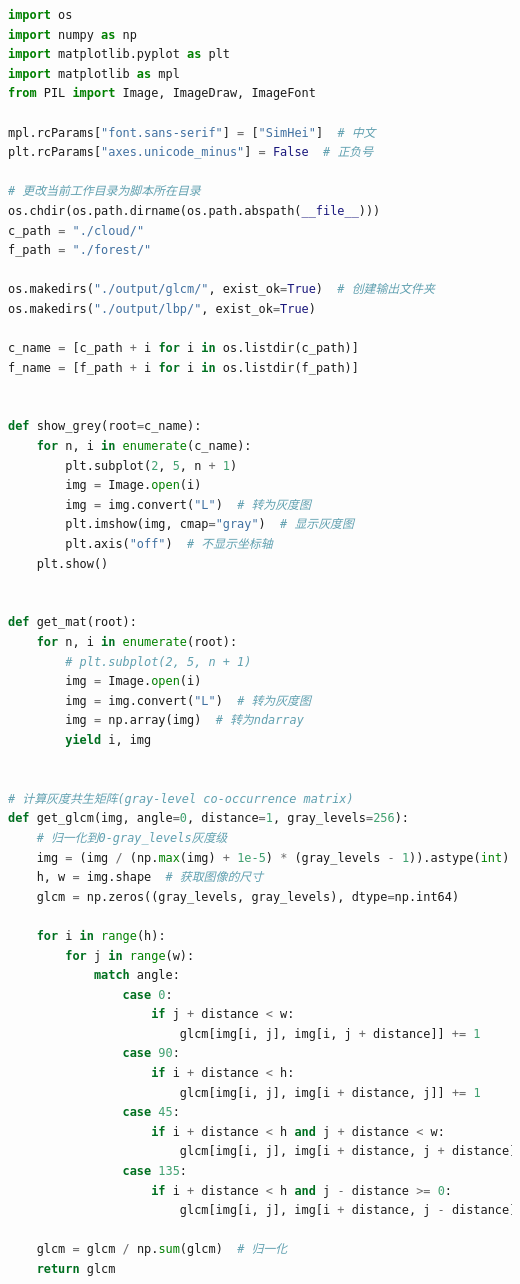 \documentclass[a4paper,12pt]{report}
\begin{document}
\begin{lstlisting}[language=Python]
import os
import numpy as np
import matplotlib.pyplot as plt
import matplotlib as mpl
from PIL import Image, ImageDraw, ImageFont

mpl.rcParams["font.sans-serif"] = ["SimHei"]  # 中文
plt.rcParams["axes.unicode_minus"] = False  # 正负号

# 更改当前工作目录为脚本所在目录
os.chdir(os.path.dirname(os.path.abspath(__file__)))
c_path = "./cloud/"
f_path = "./forest/"

os.makedirs("./output/glcm/", exist_ok=True)  # 创建输出文件夹
os.makedirs("./output/lbp/", exist_ok=True)

c_name = [c_path + i for i in os.listdir(c_path)]
f_name = [f_path + i for i in os.listdir(f_path)]


def show_grey(root=c_name):
    for n, i in enumerate(c_name):
        plt.subplot(2, 5, n + 1)
        img = Image.open(i)
        img = img.convert("L")  # 转为灰度图
        plt.imshow(img, cmap="gray")  # 显示灰度图
        plt.axis("off")  # 不显示坐标轴
    plt.show()


def get_mat(root):
    for n, i in enumerate(root):
        # plt.subplot(2, 5, n + 1)
        img = Image.open(i)
        img = img.convert("L")  # 转为灰度图
        img = np.array(img)  # 转为ndarray
        yield i, img


# 计算灰度共生矩阵(gray-level co-occurrence matrix)
def get_glcm(img, angle=0, distance=1, gray_levels=256):
    # 归一化到0-gray_levels灰度级
    img = (img / (np.max(img) + 1e-5) * (gray_levels - 1)).astype(int)
    h, w = img.shape  # 获取图像的尺寸
    glcm = np.zeros((gray_levels, gray_levels), dtype=np.int64)

    for i in range(h):
        for j in range(w):
            match angle:
                case 0:
                    if j + distance < w:
                        glcm[img[i, j], img[i, j + distance]] += 1
                case 90:
                    if i + distance < h:
                        glcm[img[i, j], img[i + distance, j]] += 1
                case 45:
                    if i + distance < h and j + distance < w:
                        glcm[img[i, j], img[i + distance, j + distance]] += 1
                case 135:
                    if i + distance < h and j - distance >= 0:
                        glcm[img[i, j], img[i + distance, j - distance]] += 1

    glcm = glcm / np.sum(glcm)  # 归一化
    return glcm



\end{lstlisting}
\end{document}
